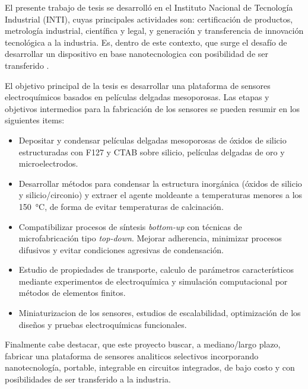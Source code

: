 	El presente trabajo de tesis se desarrolló en el Instituto Nacional de Tecnología Industrial (INTI), cuyas principales actividades son: certificación de productos, metrología industrial, científica y legal, y generación y transferencia	de innovación tecnológica a la industria. Es, dentro de este contexto, que surge el desafío de desarrollar un dispositivo en base nanotecnologica con posibilidad de ser transferido . 

	El objetivo principal de la tesis es desarrollar una plataforma de sensores electroquímicos basados en películas delgadas mesoporosas. Las etapas y objetivos intermedios para la fabricación de los sensores se pueden resumir en los siguientes items:

	\begin{itemize}
		
		\item Depositar y condensar películas delgadas mesoporosas de óxidos de silicio estructuradas con F127 y CTAB sobre silicio, películas delgadas de oro y microelectrodos.  
		
		\item Desarrollar métodos para condensar la estructura inorgánica (óxidos de silicio y silicio/circonio) y extraer el agente moldeante a temperaturas menores a los \SI{150}{\celsius}, de forma de evitar temperaturas de calcinación. 

		\item Compatibilizar procesos de síntesis \textit{bottom-up} con técnicas de microfabricación tipo \textit{top-down}. Mejorar adherencia, minimizar procesos difusivos y evitar condiciones agresivas de condensación.

		\item Estudio de propiedades de transporte, calculo de parámetros característicos mediante experimentos de electroquímica y simulación computacional por métodos de elementos finitos.

		\item Miniaturizacion de los sensores, estudios de escalabilidad, optimización de los diseños y pruebas electroquímicas funcionales.

		\end{itemize}	

	Finalmente cabe destacar, que este proyecto buscar, a mediano/largo plazo, fabricar una plataforma de sensores analiticos selectivos incorporando nanotecnología, portable, integrable en circuitos integrados, de bajo costo y con posibilidades de ser transferido a la industria.